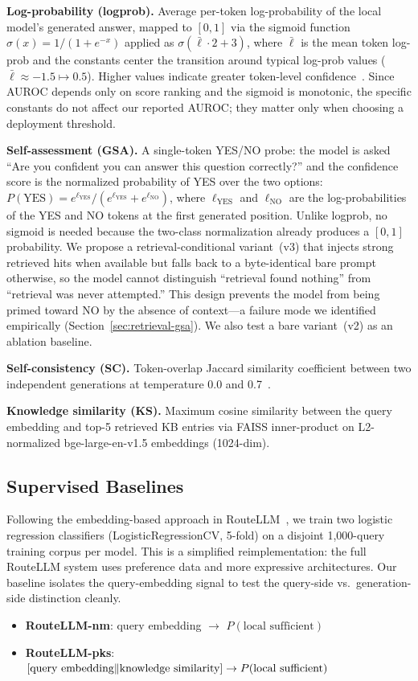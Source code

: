 \documentclass[journal]{IEEEtran}
\begin{document}
\textbf{Log-probability (logprob).} Average per-token log-probability of the local model's generated answer, mapped to $[0,1]$ via the sigmoid function $\sigma(x) = 1/(1+e^{-x})$ applied as $\sigma(\bar{\ell} \cdot 2 + 3)$, where $\bar{\ell}$ is the mean token log-prob and the constants center the transition around typical log-prob values ($\bar{\ell} \approx {-}1.5 \mapsto 0.5$). Higher values indicate greater token-level confidence~\cite{kadavath2022language}. Since AUROC depends only on score ranking and the sigmoid is monotonic, the specific constants do not affect our reported AUROC; they matter only when choosing a deployment threshold.

\textbf{Self-assessment (GSA).} A single-token YES/NO probe: the model is asked ``Are you confident you can answer this question correctly?'' and the confidence score is the normalized probability of YES over the two options: $P(\text{YES}) = e^{\ell_{\text{YES}}} / (e^{\ell_{\text{YES}}} + e^{\ell_{\text{NO}}})$, where $\ell_{\text{YES}}$ and $\ell_{\text{NO}}$ are the log-probabilities of the YES and NO tokens at the first generated position. Unlike logprob, no sigmoid is needed because the two-class normalization already produces a $[0,1]$ probability. We propose a retrieval-conditional variant~(v3) that injects strong retrieved hits when available but falls back to a byte-identical bare prompt otherwise, so the model cannot distinguish ``retrieval found nothing'' from ``retrieval was never attempted.'' This design prevents the model from being primed toward NO by the absence of context---a failure mode we identified empirically (Section~\ref{sec:retrieval-gsa}). We also test a bare variant~(v2) as an ablation baseline.

\textbf{Self-consistency (SC).} Token-overlap Jaccard similarity coefficient between two independent generations at temperature 0.0 and 0.7~\cite{wang2022selfconsistency}.

\textbf{Knowledge similarity (KS).} Maximum cosine similarity between the query embedding and top-5 retrieved KB entries via FAISS inner-product on L2-normalized bge-large-en-v1.5 embeddings (1024-dim).

\subsection{Supervised Baselines}

Following the embedding-based approach in RouteLLM~\cite{ong2024routellm}, we train two logistic regression classifiers (LogisticRegressionCV, 5-fold) on a disjoint 1,000-query training corpus per model. This is a simplified reimplementation: the full RouteLLM system uses preference data and more expressive architectures. Our baseline isolates the query-embedding signal to test the query-side vs.\ generation-side distinction cleanly.
\begin{itemize}
\item \textbf{RouteLLM-nm}: query embedding $\to$ $P(\text{local sufficient})$
\item \textbf{RouteLLM-pks}: $[\text{query embedding} \| \text{knowledge similarity}] \\ \to P(\text{local sufficient})$
\end{itemize}
\end{document}
